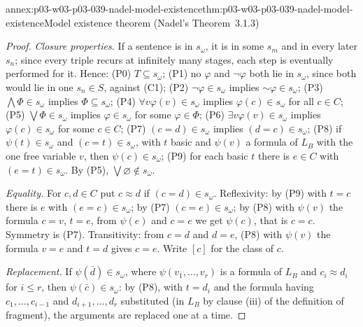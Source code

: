 \begin{annexitem}{annex:p03-w03-p03-039-nadel-model-existence}{thm:p03-w03-p03-039-nadel-model-existence}{Model existence theorem (Nadel's Theorem~3.1.3)}
\begin{proof}
\emph{Closure properties.} If a sentence is in \(s_\omega\), it is in some
\(s_m\) and in every later \(s_n\); since every triple recurs at infinitely
many stages, each step is eventually performed for it. Hence:
(P0) \(T\subseteq s_\omega\);
(P1) no \(\varphi\) and \(\neg\varphi\) both lie in \(s_\omega\), since both would
lie in one \(s_n\in S\), against (C1);
(P2) \(\neg\varphi\in s_\omega\) implies \({\sim}\varphi\in s_\omega\);
(P3) \(\bigwedge\Phi\in s_\omega\) implies \(\Phi\subseteq s_\omega\);
(P4) \(\forall v\varphi(v)\in s_\omega\) implies \(\varphi(c)\in s_\omega\) for
all \(c\in C\);
(P5) \(\bigvee\Phi\in s_\omega\) implies \(\varphi\in s_\omega\) for some
\(\varphi\in\Phi\);
(P6) \(\exists v\varphi(v)\in s_\omega\) implies \(\varphi(c)\in s_\omega\) for
some \(c\in C\);
(P7) \((c=d)\in s_\omega\) implies \((d=c)\in s_\omega\);
(P8) if \(\psi(t)\in s_\omega\) and \((c=t)\in s_\omega\), with \(t\) basic and
\(\psi(v)\) a formula of \(L_B\) with the one free variable \(v\), then
\(\psi(c)\in s_\omega\);
(P9) for each basic \(t\) there is \(e\in C\) with \((e=t)\in s_\omega\).
By (P5), \(\bigvee\varnothing\notin s_\omega\).

\emph{Equality.} For \(c,d\in C\) put \(c\approx d\) if \((c=d)\in s_\omega\).
Reflexivity: by (P9) with \(t=c\) there is \(e\) with \((e=c)\in s_\omega\);
by (P7) \((c=e)\in s_\omega\); by (P8) with \(\psi(v)\) the formula \(c=v\),
\(t=e\), from \(\psi(e)\) and \(c=e\) we get \(\psi(c)\), that is \(c=c\).
Symmetry is (P7). Transitivity: from \(c=d\) and \(d=e\), (P8) with
\(\psi(v)\) the formula \(v=e\) and \(t=d\) gives \(c=e\). Write \([c]\) for
the class of \(c\).

\emph{Replacement.} If \(\psi(\bar d)\in s_\omega\), where \(\psi(v_1,\dots,v_r)\)
is a formula of \(L_B\) and \(c_i\approx d_i\) for \(i\le r\), then
\(\psi(\bar c)\in s_\omega\): by (P8), with \(t=d_i\) and the formula having
\(c_1,\dots,c_{i-1}\) and \(d_{i+1},\dots,d_r\) substituted (in \(L_B\) by
clause (iii) of the definition of fragment), the arguments are replaced one
at a time.


\end{proof}
\end{annexitem}
